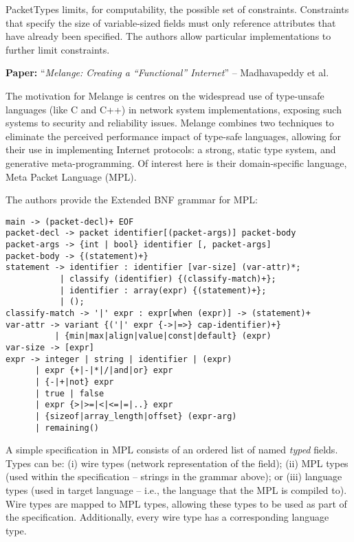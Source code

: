 \documentclass[10pt,a4paper]{article}
\newcommand{\paper}[3]{\vspace{4mm}\noindent\textbf{Paper:} ``\textit{#1}'' -- #2 \cite{#3}\vspace{3mm}}
\begin{document}
PacketTypes limits, for computability, the possible set of constraints. Constraints that
specify the size of variable-sized fields must only reference attributes that have already
been specified. The authors allow particular implementations to further limit
constraints.

\paper{Melange: Creating a ``Functional'' Internet}{Madhavapeddy et al.}{madhavapeddy2007melange}

The motivation for Melange is centres on the widespread use of type-unsafe languages (like
C and C++) in network system implementations, exposing such systems to security and
reliability issues. Melange combines two techniques to eliminate the perceived performance
impact of type-safe languages, allowing for their use in implementing Internet protocols:
a strong, static type system, and generative meta-programming. Of interest here is their
domain-specific language, Meta Packet Language (MPL).

The authors provide the Extended BNF grammar for MPL:

\begin{verbatim}
main -> (packet-decl)+ EOF
packet-decl -> packet identifier[(packet-args)] packet-body
packet-args -> {int | bool} identifier [, packet-args]
packet-body -> {(statement)+}
statement -> identifier : identifier [var-size] (var-attr)*;
           | classify (identifier) {(classify-match)+};
           | identifier : array(expr) {(statement)+};
           | ();
classify-match -> '|' expr : expr[when (expr)] -> (statement)+
var-attr -> variant {('|' expr {->|=>} cap-identifier)+}
          | {min|max|align|value|const|default} (expr)
var-size -> [expr]
expr -> integer | string | identifier | (expr)
      | expr {+|-|*|/|and|or} expr
      | {-|+|not} expr
      | true | false
      | expr {>|>=|<|<=|=|..} expr
      | {sizeof|array_length|offset} (expr-arg)
      | remaining()
\end{verbatim}

A simple specification in MPL consists of an ordered list of named \emph{typed} fields.
Types can be: (i) wire types (network representation of the field); (ii) MPL types (used
within the specification -- strings in the grammar above); or (iii) language types (used
in target language -- i.e., the language that the MPL is compiled to). Wire types are
mapped to MPL types, allowing these types to be used as part of the specification.
Additionally, every wire type has a corresponding language type. 
\end{document}
